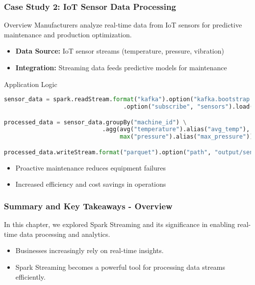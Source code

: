 \documentclass[aspectratio=169]{beamer}
\begin{document}
\begin{frame}[fragile]
    \frametitle{Case Study 2: IoT Sensor Data Processing}

    \begin{block}{Overview}
        Manufacturers analyze real-time data from IoT sensors for predictive maintenance and production optimization.
    \end{block}

    \begin{itemize}
        \item \textbf{Data Source: } IoT sensor streams (temperature, pressure, vibration)
        \item \textbf{Integration: } Streaming data feeds predictive models for maintenance
    \end{itemize}

    \begin{block}{Application Logic}
        \begin{lstlisting}[language=Python]
sensor_data = spark.readStream.format("kafka").option("kafka.bootstrap.servers", "localhost:9092") \
                                  .option("subscribe", "sensors").load()

processed_data = sensor_data.groupBy("machine_id") \
                            .agg(avg("temperature").alias("avg_temp"),
                                 max("pressure").alias("max_pressure"))

processed_data.writeStream.format("parquet").option("path", "output/sensor_data").start()
        \end{lstlisting}
    \end{block}

    \begin{itemize}
        \item Proactive maintenance reduces equipment failures
        \item Increased efficiency and cost savings in operations
    \end{itemize}
\end{frame}

\begin{frame}
    \frametitle{Summary and Key Takeaways - Overview}
    In this chapter, we explored Spark Streaming and its significance in enabling real-time data processing and analytics. 
    \begin{itemize}
        \item Businesses increasingly rely on real-time insights.
        \item Spark Streaming becomes a powerful tool for processing data streams efficiently.
    \end{itemize}
\end{frame}
\end{document}
